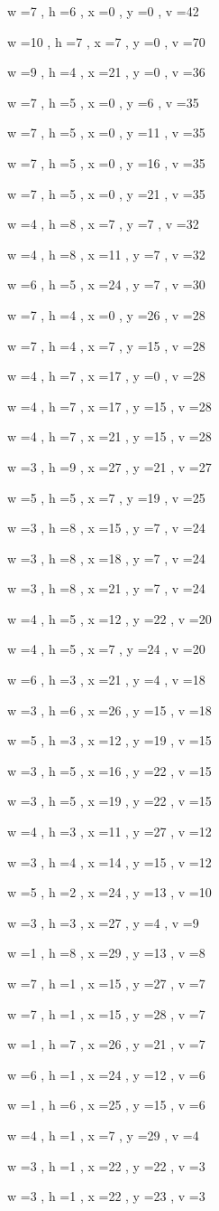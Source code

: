\documentclass[11pt]{article}
\begin{document}
w =7 , h =6 , x =0 , y =0 , v =42
\par
w =10 , h =7 , x =7 , y =0 , v =70
\par
w =9 , h =4 , x =21 , y =0 , v =36
\par
w =7 , h =5 , x =0 , y =6 , v =35
\par
w =7 , h =5 , x =0 , y =11 , v =35
\par
w =7 , h =5 , x =0 , y =16 , v =35
\par
w =7 , h =5 , x =0 , y =21 , v =35
\par
w =4 , h =8 , x =7 , y =7 , v =32
\par
w =4 , h =8 , x =11 , y =7 , v =32
\par
w =6 , h =5 , x =24 , y =7 , v =30
\par
w =7 , h =4 , x =0 , y =26 , v =28
\par
w =7 , h =4 , x =7 , y =15 , v =28
\par
w =4 , h =7 , x =17 , y =0 , v =28
\par
w =4 , h =7 , x =17 , y =15 , v =28
\par
w =4 , h =7 , x =21 , y =15 , v =28
\par
w =3 , h =9 , x =27 , y =21 , v =27
\par
w =5 , h =5 , x =7 , y =19 , v =25
\par
w =3 , h =8 , x =15 , y =7 , v =24
\par
w =3 , h =8 , x =18 , y =7 , v =24
\par
w =3 , h =8 , x =21 , y =7 , v =24
\par
w =4 , h =5 , x =12 , y =22 , v =20
\par
w =4 , h =5 , x =7 , y =24 , v =20
\par
w =6 , h =3 , x =21 , y =4 , v =18
\par
w =3 , h =6 , x =26 , y =15 , v =18
\par
w =5 , h =3 , x =12 , y =19 , v =15
\par
w =3 , h =5 , x =16 , y =22 , v =15
\par
w =3 , h =5 , x =19 , y =22 , v =15
\par
w =4 , h =3 , x =11 , y =27 , v =12
\par
w =3 , h =4 , x =14 , y =15 , v =12
\par
w =5 , h =2 , x =24 , y =13 , v =10
\par
w =3 , h =3 , x =27 , y =4 , v =9
\par
w =1 , h =8 , x =29 , y =13 , v =8
\par
w =7 , h =1 , x =15 , y =27 , v =7
\par
w =7 , h =1 , x =15 , y =28 , v =7
\par
w =1 , h =7 , x =26 , y =21 , v =7
\par
w =6 , h =1 , x =24 , y =12 , v =6
\par
w =1 , h =6 , x =25 , y =15 , v =6
\par
w =4 , h =1 , x =7 , y =29 , v =4
\par
w =3 , h =1 , x =22 , y =22 , v =3
\par
w =3 , h =1 , x =22 , y =23 , v =3
\par
\newpage
\end{document}
